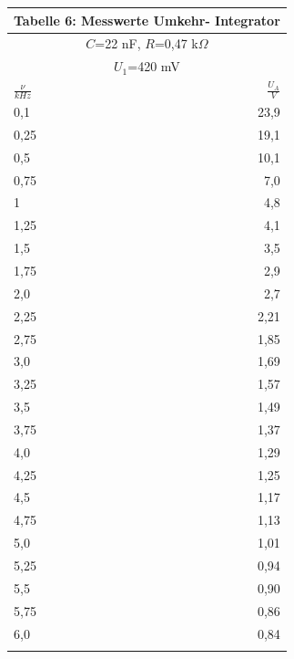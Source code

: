 \documentclass{scrartcl}
\begin{document}
 \begin{minipage}{0.6\textwidth}
\begin{tabular}{@{}lr@{}}
 \multicolumn{2}{c}{Tabelle 6: Messwerte Umkehr- Integrator} \\

    \toprule
     \multicolumn{2}{c}{$C$=22 nF, $R$=0,47 k$\Omega$} \\
     \multicolumn{2}{c}{$U_1$=420 mV} \\
     \cmidrule(r){1-2}
    $\frac{\nu}{kHz}$ & $\frac{U_A}{V}$ \\
    \midrule
       0,1 & 23,9  \\
     0,25 & 19,1  \\
     0,5 & 10,1 \\
     0,75 & 7,0 \\
     1 & 4,8  \\
     1,25 & 4,1 \\
     1,5 & 3,5 \\
     1,75 & 2,9 \\
     2,0 & 2,7 \\
     2,25 & 2,21 \\
     2,75 & 1,85 \\
     3,0 & 1,69 \\
     3,25 & 1,57 \\
     3,5 & 1,49 \\
     3,75 & 1,37 \\
     4,0 & 1,29 \\
     4,25 & 1,25 \\
     4,5 & 1,17 \\
     4,75 & 1,13 \\
     5,0 & 1,01 \\
     5,25 & 0,94 \\
     5,5 & 0,90 \\
     5,75 & 0,86 \\
     6,0 & 0,84 \\
     			\\
     \bottomrule

\end{tabular}

\end{minipage}
\end{document}

